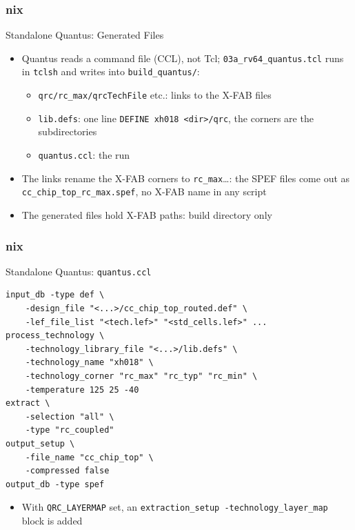 \documentclass{beamer}
\newcommand{\astitle}{nix}
\newcommand{\assubtitle}{nix}
\newcommand{\cmd}[1]{\texttt{#1}}
\begin{document}
\renewcommand{\assubtitle}{Standalone Quantus: Generated Files}
\begin{frame}
\frametitle{\astitle}
\begin{block}{\assubtitle}
  \begin{itemize}
    \item Quantus reads a command file (CCL), not Tcl;
      \cmd{03a\_rv64\_quantus.tcl} runs in \cmd{tclsh} and writes into
      \cmd{build\_quantus/}:
    \begin{itemize}
      \item \cmd{qrc/rc\_max/qrcTechFile} etc.: links to the X-FAB files
      \item \cmd{lib.defs}: one line \cmd{DEFINE xh018 <dir>/qrc}, the
        corners are the subdirectories
      \item \cmd{quantus.ccl}: the run
    \end{itemize}
    \item The links rename the X-FAB corners to \cmd{rc\_max}\ldots: the
      SPEF files come out as \cmd{cc\_chip\_top\_rc\_max.spef}, no X-FAB
      name in any script
    \item The generated files hold X-FAB paths: build directory only
  \end{itemize}
\end{block}
\end{frame}

\renewcommand{\assubtitle}{Standalone Quantus: \texttt{quantus.ccl}}
\begin{frame}[fragile]
\frametitle{\astitle}
\begin{block}{\assubtitle}
\begin{lstlisting}[style=sh]
input_db -type def \
    -design_file "<...>/cc_chip_top_routed.def" \
    -lef_file_list "<tech.lef>" "<std_cells.lef>" ...
process_technology \
    -technology_library_file "<...>/lib.defs" \
    -technology_name "xh018" \
    -technology_corner "rc_max" "rc_typ" "rc_min" \
    -temperature 125 25 -40
extract \
    -selection "all" \
    -type "rc_coupled"
output_setup \
    -file_name "cc_chip_top" \
    -compressed false
output_db -type spef
\end{lstlisting}
  \scriptsize
  \begin{itemize}
    \item With \cmd{QRC\_LAYERMAP} set, an \cmd{extraction\_setup
      -technology\_layer\_map} block is added
  \end{itemize}
\end{block}
\end{frame}
\end{document}
